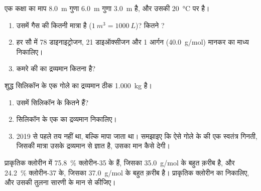 \begin{exercise}[$\star\star\star$]\label{exo:g10:the-mole:13}
एक कक्षा का माप \qty{8.0}{m} गुणा \qty{6.0}{m} गुणा \qty{3.0}{m} है, और
उसकी  \qty{20}{\celsius} पर है।
\begin{enumerate}
  \item उसमें गैस की कितनी मात्रा है ($\qty{1}{m^3} =
        \qty{1000}{L}$)? कितने ?
  \item हर सौ में 78  डाइनाइट्रोजन, 21 डाइऑक्सीजन और 1
        आर्गन (\qty{40.0}{g/mol}) मानकर  का माध्य
         निकालिए।
  \item कमरे की  का द्रव्यमान कितना है?
\end{enumerate}
\end{exercise}

\begin{exercise}[$\star\star\star$]\label{exo:g10:the-mole:14}
शुद्ध सिलिकॉन के एक गोले का द्रव्यमान ठीक \qty{1.000}{kg} है।
\begin{enumerate}
  \item उसमें सिलिकॉन के कितने  हैं?
  \item सिलिकॉन के एक  का द्रव्यमान निकालिए।
  \item 2019 से पहले  तय नहीं था, बल्कि मापा जाता था।
        समझाइए कि ऐसे गोले के  की एक स्वतंत्र गिनती, जिसकी मात्रा उसके
        द्रव्यमान से ज्ञात है, उसका मान कैसे देगी।
\end{enumerate}
\end{exercise}

\begin{exercise}[$\star\star\star$]\label{exo:g10:the-mole:15}
प्राकृतिक क्लोरीन में \qty{75.8}{\percent}  क्लोरीन-35 के हैं, जिसका
 \qty{35.0}{g/mol} के बहुत क़रीब है, और \qty{24.2}{\percent}
क्लोरीन-37 के, जिसका  \qty{37.0}{g/mol} के बहुत क़रीब है।
प्राकृतिक क्लोरीन का  निकालिए, और उसकी तुलना
सारणी के मान से कीजिए।
\end{exercise}

